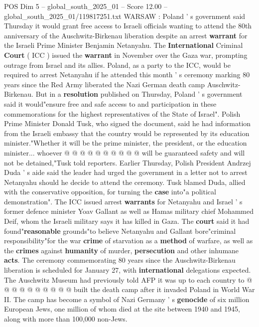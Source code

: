 \begin{textsample}{POS Dim 5 – global\_south\_2025\_01 – Score 12.00 – global\_south\_2025\_01/119817251.txt}  \label{ex:f5_pos_360}
WARSAW : Poland ' s government said Thursday it would grant free access to Israeli officials wanting to attend the 80th anniversary of the Auschwitz-Birkenau liberation despite an arrest \textbf{warrant} for the Israeli Prime Minister Benjamin Netanyahu.
The \textbf{International} Criminal \textbf{Court} ( ICC ) issued the \textbf{warrant} in November over the Gaza war, prompting outrage from Israel and its allies.
Poland, as a party to the ICC, would be required to arrest Netanyahu if he attended this month ' s ceremony marking 80 years since the Red Army liberated the Nazi German death camp Auschwitz-Birkenau.
But in a \textbf{resolution} published on Thursday, Poland ' s government said it would"ensure free and safe access to and participation in these commemorations for the highest representatives of the State of Israel".
Polish Prime Minister Donald Tusk, who signed the document, said he had information from the Israeli embassy that the country would be represented by its education minister."Whether it will be the prime minister, the president, or the education minister... whoever @ @ @ @ @ @ @ @ @ @ will be guaranteed safety and will not be detained,"Tusk told reporters.
Earlier Thursday, Polish President Andrzej Duda ' s aide said the leader had urged the government in a letter not to arrest Netanyahu should he decide to attend the ceremony.
Tusk blamed Duda, allied with the conservative opposition, for turning the \textbf{case} into"a political demonstration".
The ICC issued arrest \textbf{warrants} for Netanyahu and Israel ' s former defence minister Yoav Gallant as well as Hamas military chief Mohammed Deif, whom the Israeli military says it has killed in Gaza.
The \textbf{court} said it had found"\textbf{reasonable} grounds"to believe Netanyahu and Gallant bore"criminal responsibility"for the war \textbf{crime} of starvation as a \textbf{method} of warfare, as well as the \textbf{crimes} against \textbf{humanity} of murder, \textbf{persecution} and other inhumane \textbf{acts}.
The ceremony commemorating 80 years since the Auschwitz-Birkenau liberation is scheduled for January 27, with \textbf{international} delegations expected.
The Auschwitz Museum had previously told AFP it was up to each country to @ @ @ @ @ @ @ @ @ @ built the death camp after it invaded Poland in World War II.
The camp has become a symbol of Nazi Germany ' s \textbf{genocide} of six million European Jews, one million of whom died at the site between 1940 and 1945, along with more than 100,000 non-Jews.

\end{textsample}
